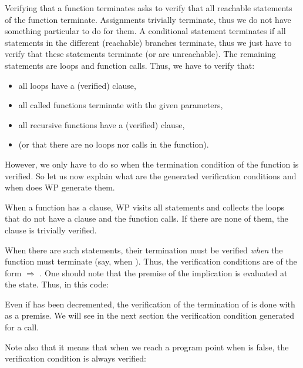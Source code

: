 

Verifying that a function terminates asks to verify that all reachable
statements of the function terminate. Assignments trivially terminate, thus
we do not have something particular to do for them. A conditional statement
terminates if all statements in the different (reachable) branches terminate,
thus we just have to verify that these statements terminate (or are unreachable).
The remaining statements are loops and function calls. Thus, we have to verify
that:
\begin{itemize}
  \item all loops have a (verified)  clause,
  \item all called functions terminate with the given parameters,
  \item all recursive functions have a (verified)  clause,
  \item (or that there are no loops nor calls in the function).
\end{itemize}


However, we only have to do so when the termination condition of the function
is verified. So let us now explain what are the generated verification
conditions and when does WP generate them.


When a function has a  clause, WP visits all statements
and collects the loops that do not have a  clause and
the function calls. If there are none of them, the 
clause is trivially verified.




When there are such statements, their termination must be verified {\em when}
the function must terminate (say, when ). Thus, the verification
conditions are of the form
 $\Rightarrow$ .
One should note that the premise of the implication is evaluated at the
 state. Thus, in this code:




Even if  has been decremented, the verification of the
termination of  is done with
 as a premise. We will see in the
next section the verification condition generated for a call.


Note also that it means that when we reach a program point when 
is false, the verification condition is always verified:


